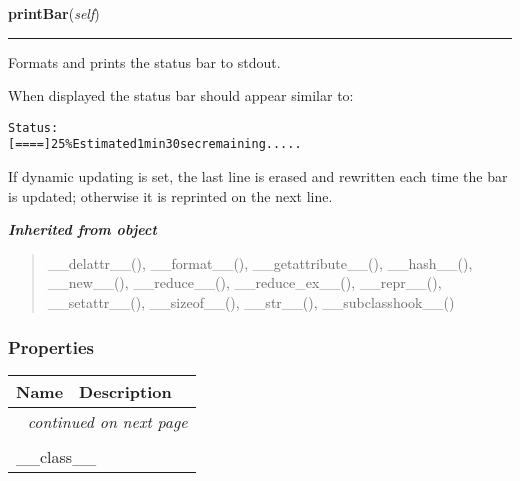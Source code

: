     \label{morpher:misc:status_reporter:StatusReporter:printBar}

    \vspace{0.5ex}

\hspace{.8\funcindent}\begin{boxedminipage}{\funcwidth}

    \raggedright \textbf{printBar}(\textit{self})

    \vspace{-1.5ex}

    \rule{\textwidth}{0.5\fboxrule}
\setlength{\parskip}{2ex}
    Formats and prints the status bar to stdout.

    When displayed the status bar should appear similar to:

\begin{alltt}
   Status:
   [====          ]  25\% Estimated  1 min 30 sec remaining.....\end{alltt}

    If dynamic updating is set, the last line is erased and rewritten each 
    time the bar is updated; otherwise it is reprinted on the next line.

\setlength{\parskip}{1ex}
    \end{boxedminipage}


\large{\textbf{\textit{Inherited from object}}}

\begin{quote}
\_\_delattr\_\_(), \_\_format\_\_(), \_\_getattribute\_\_(), \_\_hash\_\_(), \_\_new\_\_(), \_\_reduce\_\_(), \_\_reduce\_ex\_\_(), \_\_repr\_\_(), \_\_setattr\_\_(), \_\_sizeof\_\_(), \_\_str\_\_(), \_\_subclasshook\_\_()
\end{quote}


  \subsubsection{Properties}

    \vspace{-1cm}
\hspace{\varindent}\begin{longtable}{|p{\varnamewidth}|p{\vardescrwidth}|l}
\cline{1-2}
\cline{1-2} \centering \textbf{Name} & \centering \textbf{Description}& \\
\cline{1-2}
\endhead\cline{1-2}\multicolumn{3}{r}{\small\textit{continued on next page}}\\\endfoot\cline{1-2}
\endlastfoot\multicolumn{2}{|l|}{\textit{Inherited from object}}\\
\multicolumn{2}{|p{\varwidth}|}{\raggedright \_\_class\_\_}\\
\cline{1-2}
\end{longtable}


